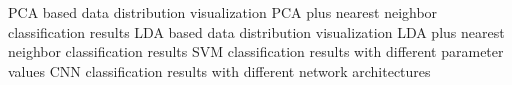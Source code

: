 \documentclass[a4paper,12pt]{exam}
\begin{document}
\begin{questions}
    \question PCA based data distribution visualization
    \question PCA plus nearest neighbor classification results
    \question LDA based data distribution visualization
    \question LDA plus nearest neighbor classification results
    \question SVM classification results with different parameter values
    \question CNN classification results with different network architectures
\end{questions}
\end{document}
